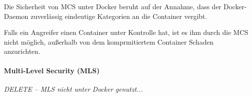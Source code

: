 \documentclass[../main.tex]{subfiles}
\begin{document}
					Die Sicherheit von MCS unter Docker beruht auf der Annahme, dass der Docker-Daemon zuverlässig eindeutige Kategorien an die Container vergibt.

					Falls ein Angreifer einen Container unter Kontrolle hat, ist es ihm durch die MCS nicht möglich, außerhalb von dem komprmitiertem Container Schaden anzurichten.




				\paragraph{Multi-Level Security (MLS)}
					\emph{DELETE -- MLS nicht unter Docker genutzt...}

\end{document}
